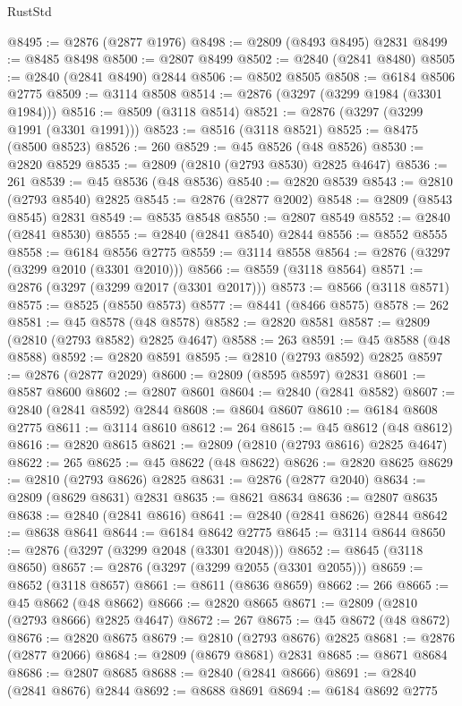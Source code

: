\begin{lexlean}{RustStd}
\begin{coremodule}
@8495 := @2876 (@2877 @1976)
@8498 := @2809 (@8493 @8495) @2831
@8499 := @8485 @8498
@8500 := @2807 @8499
@8502 := @2840 (@2841 @8480)
@8505 := @2840 (@2841 @8490) @2844
@8506 := @8502 @8505
@8508 := @6184 @8506 @2775
@8509 := @3114 @8508
@8514 := @2876 (@3297 (@3299 @1984 (@3301 @1984)))
@8516 := @8509 (@3118 @8514)
@8521 := @2876 (@3297 (@3299 @1991 (@3301 @1991)))
@8523 := @8516 (@3118 @8521)
@8525 := @8475 (@8500 @8523)
@8526 := 260
@8529 := @45 @8526 (@48 @8526)
@8530 := @2820 @8529
@8535 := @2809 (@2810 (@2793 @8530) @2825 @4647)
@8536 := 261
@8539 := @45 @8536 (@48 @8536)
@8540 := @2820 @8539
@8543 := @2810 (@2793 @8540) @2825
@8545 := @2876 (@2877 @2002)
@8548 := @2809 (@8543 @8545) @2831
@8549 := @8535 @8548
@8550 := @2807 @8549
@8552 := @2840 (@2841 @8530)
@8555 := @2840 (@2841 @8540) @2844
@8556 := @8552 @8555
@8558 := @6184 @8556 @2775
@8559 := @3114 @8558
@8564 := @2876 (@3297 (@3299 @2010 (@3301 @2010)))
@8566 := @8559 (@3118 @8564)
@8571 := @2876 (@3297 (@3299 @2017 (@3301 @2017)))
@8573 := @8566 (@3118 @8571)
@8575 := @8525 (@8550 @8573)
@8577 := @8441 (@8466 @8575)
@8578 := 262
@8581 := @45 @8578 (@48 @8578)
@8582 := @2820 @8581
@8587 := @2809 (@2810 (@2793 @8582) @2825 @4647)
@8588 := 263
@8591 := @45 @8588 (@48 @8588)
@8592 := @2820 @8591
@8595 := @2810 (@2793 @8592) @2825
@8597 := @2876 (@2877 @2029)
@8600 := @2809 (@8595 @8597) @2831
@8601 := @8587 @8600
@8602 := @2807 @8601
@8604 := @2840 (@2841 @8582)
@8607 := @2840 (@2841 @8592) @2844
@8608 := @8604 @8607
@8610 := @6184 @8608 @2775
@8611 := @3114 @8610
@8612 := 264
@8615 := @45 @8612 (@48 @8612)
@8616 := @2820 @8615
@8621 := @2809 (@2810 (@2793 @8616) @2825 @4647)
@8622 := 265
@8625 := @45 @8622 (@48 @8622)
@8626 := @2820 @8625
@8629 := @2810 (@2793 @8626) @2825
@8631 := @2876 (@2877 @2040)
@8634 := @2809 (@8629 @8631) @2831
@8635 := @8621 @8634
@8636 := @2807 @8635
@8638 := @2840 (@2841 @8616)
@8641 := @2840 (@2841 @8626) @2844
@8642 := @8638 @8641
@8644 := @6184 @8642 @2775
@8645 := @3114 @8644
@8650 := @2876 (@3297 (@3299 @2048 (@3301 @2048)))
@8652 := @8645 (@3118 @8650)
@8657 := @2876 (@3297 (@3299 @2055 (@3301 @2055)))
@8659 := @8652 (@3118 @8657)
@8661 := @8611 (@8636 @8659)
@8662 := 266
@8665 := @45 @8662 (@48 @8662)
@8666 := @2820 @8665
@8671 := @2809 (@2810 (@2793 @8666) @2825 @4647)
@8672 := 267
@8675 := @45 @8672 (@48 @8672)
@8676 := @2820 @8675
@8679 := @2810 (@2793 @8676) @2825
@8681 := @2876 (@2877 @2066)
@8684 := @2809 (@8679 @8681) @2831
@8685 := @8671 @8684
@8686 := @2807 @8685
@8688 := @2840 (@2841 @8666)
@8691 := @2840 (@2841 @8676) @2844
@8692 := @8688 @8691
@8694 := @6184 @8692 @2775

\end{coremodule}
\end{lexlean}
